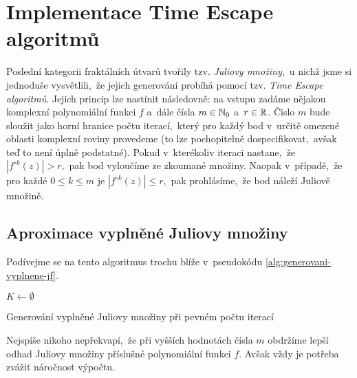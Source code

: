 \section{Implementace Time Escape algoritmů}\label{sec:implementace-tea}

Poslední kategorii fraktálních útvarů tvořily tzv. \emph{Juliovy množiny},~u nichž jsme si jednoduše vysvětlili,~že jejich generování probíhá pomocí tzv. \emph{Time Escape algoritmů}. Jejich princip lze nastínit následovně: na vstupu zadáme nějakou komplexní polynomiální funkci $f$ a~dále čísla $m\in\mathbb{N}_0$ a~$r\in\mathbb{R}$. Čislo $m$ bude sloužit jako horní hranice počtu iterací,~který pro každý bod v~určitě omezené oblasti komplexní roviny provedeme (to lze pochopitelně dospecifikovat,~avšak teď to není úplně podstatné). Pokud v~kterékoliv iteraci nastane,~že $|f^{\circ k}(z)|>r$,~pak bod vyloučíme ze zkoumané množiny. Naopak v~případě,~že pro každé $0\leqslant k\leqslant m$ je $|f^{\circ k}(z)|\leqslant r$,~pak prohlásíme,~že bod náleží Juliově množině.

\subsection{Aproximace vyplněné Juliovy množiny}\label{subsec:aproximace-vyplnene-juliovy-mnoziny}

Podívejme se na tento algoritmus trochu blíže v~pseudokódu \ref{alg:generovani-vyplnene-jf}.
\begin{algorithm}
    $K\gets\emptyset$\;
    \;
    \caption{Generování vyplněné Juliovy množiny při pevném počtu iterací}
    \label{alg:generovani-vyplnene-jf}
\end{algorithm}
Nejspíše nikoho nepřekvapí,~že při vyšších hodnotách čísla $m$ obdržíme lepší odhad Juliovy množiny příslušné polynomiální funkci $f$. Avšak vždy je potřeba zvážit náročnost výpočtu.

